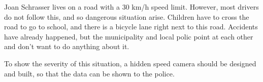 Joan Schrasser lives on a road with a 30 km/h speed limit. However, most drivers do not follow this, and so dangerous situation arise.
Children have to cross the road to go to school, and there is a bicycle lane right next to this road.
Accidents have already happened, but the municipality and local polic point at each other and don't want to do anything about it.
\cite{avans:assignment}

To show the severity of this situation, a hidden speed camera should be designed and built, so that the data can be shown to the police.
